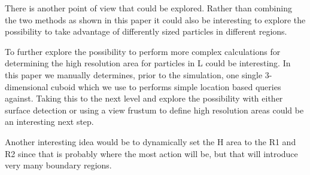\documentclass[../../main.tex]{subfiles}
\begin{document}
There is another point of view that could be explored. Rather than combining the two methods as shown in this paper it could also be interesting to explore the possibility to take advantage of differently sized particles in different regions.

To further explore the possibility to perform more complex calculations for determining the high resolution area for particles in L could be interesting. In this paper we manually determines, prior to the simulation, one single 3-dimensional cuboid which we use to performs simple location based queries against. Taking this to the next level and explore the possibility with either surface detection or using a view frustum to define high resolution areas could be an interesting next step. 

Another interesting idea would be to dynamically set the H area to the R1 and R2 since that is probably where the most action will be, but that will introduce very many boundary regions.

\end{document}
